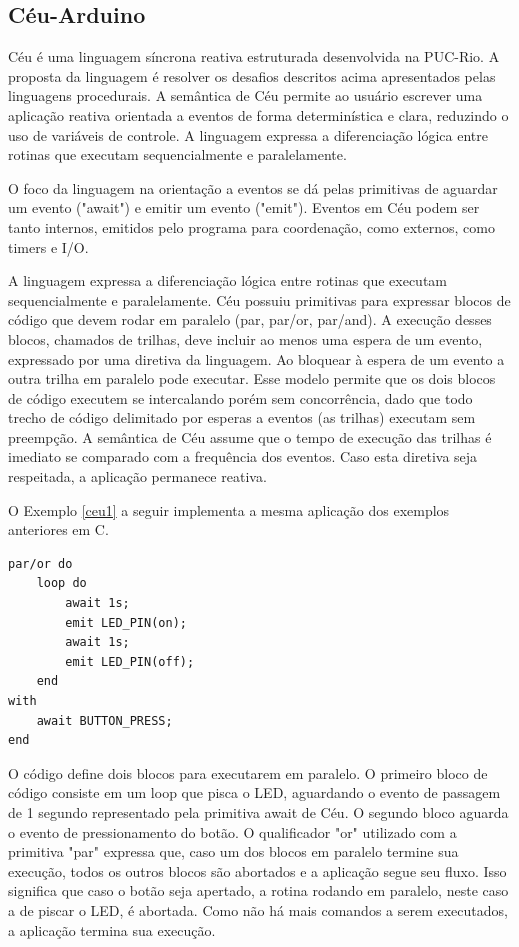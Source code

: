 \documentclass[11pt]{article}
\begin{document}
\subsection{Céu-Arduino}
\tab Céu é uma linguagem síncrona reativa estruturada desenvolvida na PUC-Rio. A proposta da linguagem é resolver os desafios descritos acima apresentados pelas linguagens procedurais. A semântica de Céu permite ao usuário escrever uma aplicação reativa orientada a eventos de forma determinística e clara, reduzindo o uso de variáveis de controle. A linguagem expressa a diferenciação lógica entre rotinas que executam sequencialmente e paralelamente.
\par O foco da linguagem na orientação a eventos se dá pelas primitivas de aguardar um evento ("await") e emitir um evento ("emit"). Eventos em Céu podem ser tanto internos, emitidos pelo programa para coordenação, como externos, como timers e I/O.
\par A linguagem expressa a diferenciação lógica entre rotinas que executam sequencialmente e paralelamente. Céu possuiu primitivas para expressar blocos de código que devem rodar em paralelo (par, par/or, par/and). A execução desses blocos, chamados de trilhas, deve incluir ao menos uma espera de um evento, expressado por uma diretiva da linguagem. Ao bloquear à espera de um evento a outra trilha em paralelo pode executar. Esse modelo permite que os dois blocos de código executem se intercalando porém sem concorrência, dado que todo trecho de código delimitado por esperas a eventos (as trilhas) executam sem preempção. A semântica de Céu assume que o tempo de execução das trilhas é imediato se comparado com a frequência dos eventos. Caso esta diretiva seja respeitada, a aplicação permanece reativa.
\par O Exemplo \ref{ceu1} a seguir implementa a mesma aplicação dos exemplos anteriores em C.  
\begin{lstlisting}[style=CStyle,label=ceu1,caption=Aplicação em Céu que imprime mensagem cada segundo]
par/or do
    loop do
        await 1s;
        emit LED_PIN(on);
        await 1s;
        emit LED_PIN(off);
    end
with
    await BUTTON_PRESS;
end
\end{lstlisting}
\par O código define dois blocos para executarem em paralelo. O primeiro bloco de código consiste em um loop que pisca o LED, aguardando o evento de passagem de 1 segundo representado pela primitiva await de Céu. O segundo bloco aguarda o evento de pressionamento do botão. O qualificador "or" utilizado com a primitiva "par" expressa que, caso um dos blocos em paralelo termine sua execução, todos os outros blocos são abortados e a aplicação segue seu fluxo. Isso significa que caso o botão seja apertado, a rotina rodando em paralelo, neste caso a de piscar o LED, é abortada. Como não há mais comandos a serem executados, a aplicação termina sua execução.
\end{document}
